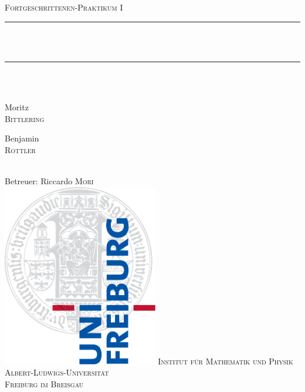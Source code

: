 \newcommand{\HRule}{\rule{\linewidth}{0.5mm}}
\begin{titlepage}
\begin{center}
  \textsc{\Large Fortgeschrittenen-Praktikum I}\\[0.5cm]
  \HRule \\[0.4cm]
  { \huge \bfseries \exptitle}\\
  \HRule \\[0.5cm]
  \large \expdate\\[0.5cm]  
  \begin{minipage}{0.4\textwidth}
    \begin{flushleft} \large
      Moritz \\ \textsc{Bittlering}
    \end{flushleft}
  \end{minipage}
  \hfill
  \begin{minipage}{0.4\textwidth}
    \begin{flushright} \large
      Benjamin \\ \textsc{Rottler}
    \end{flushright}
  \end{minipage}
  \\[1cm]
  \large 
  Betreuer: Riccardo \textsc{Mori} \\[3cm]
  \includegraphics[height=8cm]{../../img/logo_uni.pdf}
  \vfill
  \normalsize
  \textsc{Institut für Mathematik und Physik} \\
  \textsc{Albert-Ludwigs-Universität} \\
  \textsc{Freiburg im Breisgau}
\end{center}
\end{titlepage}